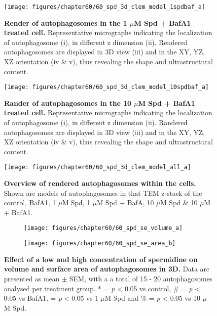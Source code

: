 \begin{figure}[!htbp]
\center
  \texttt{[image: figures/chapter60/60\_spd\_3d\_clem\_model\_1spdbaf\_a]}
  \caption[Render of autophagosomes in the 1 $\mu$M Spd  + BafA1 treated cell]{\textbf{Render of autophagosomes in the 1 $\mu$M Spd  + BafA1 treated cell.} Representative micrographs indicating the localization of autophagosome (i), in different z dimension (ii). Rendered autophagosomes are displayed in 3D view (iii) and in the XY, YZ, XZ orientation  (iv \& v), thus revealing the shape and ultrastructural content.}
  \label{fig:60_spd_3d_clem_model_1spdbaf_a}
\end{figure} 

\begin{figure}[!htbp]
\center
  \texttt{[image: figures/chapter60/60\_spd\_3d\_clem\_model\_10spdbaf\_a]}
  \caption[Render of autophagosomes in the 10 $\mu$M Spd  + BafA1 treated cell]{\textbf{Rander of autophagosomes in the 10 $\mu$M Spd  + BafA1 treated cell.} Representative micrographs indicating the localization of autophagosome (i), in different z dimension (ii). Randered autophagosomes are displayed in 3D view (iii) and in the XY, YZ, XZ orientation  (iv \& v), thus revealing the shape and ultrastructural content.}
  \label{fig:60_spd_3d_clem_model_10spdbaf_a}
\end{figure} 

\begin{landscape}
\begin{figure}[!htbp]
\center
  \texttt{[image: figures/chapter60/60\_spd\_3d\_clem\_model\_all\_a]}
  \caption[Overview of rendered autophagosomes within the cells]{\textbf{Overview of rendered autophagosomes within the cells.} Shown are models of autophagosomes in that TEM z-stack of the control, BafA1, 1 $\mu$M Spd, 1 $\mu$M Spd + BafA, 10 $\mu$M Spd \& 10 $\mu$M + BafA1.}
  \label{fig:60_spd_3d_clem_model_all_a}
\end{figure} 
\end{landscape}


\begin{figure}[!htbp]
  \begin{subfigure}[b]{0.495\linewidth}
    \texttt{[image: figures/chapter60/60\_spd\_se\_volume\_a]}
  \end{subfigure}
  \begin{subfigure}[b]{0.495\linewidth}
    \texttt{[image: figures/chapter60/60\_spd\_se\_area\_b]}
  \end{subfigure}
    \caption[Effect of a low and high concentration of spermidine on volume and surface area of autophagosomes in 3D]{\textbf{Effect of a low and high concentration of spermidine on volume and surface area of autophagosomes in 3D.} Data are presented as mean $\pm$ SEM, with a a total of 15 - 20 autophagosomes analysed per treatment group. * = \textit{p} < 0.05 vs control, \# = \textit{p} < 0.05 vs BafA1, \@ = \textit{p} < 0.05 vs 1 $\mu$M Spd and \% = \textit{p} < 0.05 vs 10 $\mu$M Spd.}
  \label{fig:60_spd_se_volume_a}
\end{figure}

